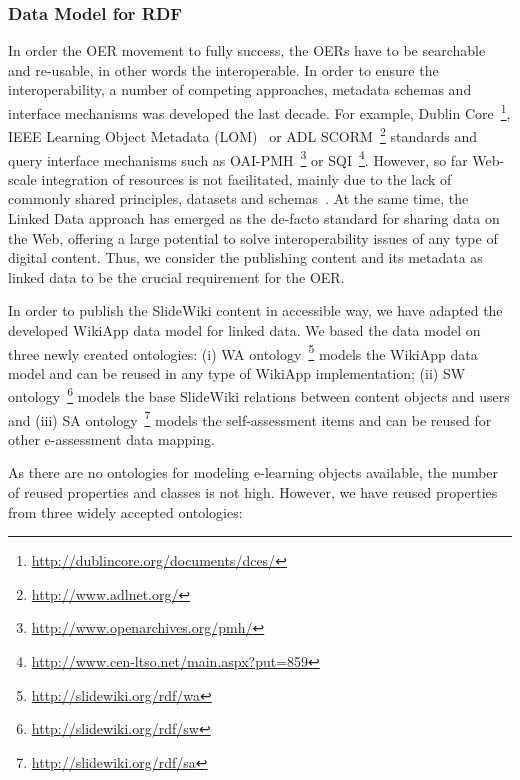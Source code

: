 \documentclass[ngerman,UKenglish,table]{scrbook}
\begin{document}
 

\subsubsection{Data Model for RDF}
\label{sec:data_model_rdf}

In order the OER movement to fully success, the OERs have to be searchable and re-usable, in other words the interoperable.
In order to ensure the interoperability, a number of competing approaches, metadata schemas and interface mechanisms was developed the last decade. 
For example, Dublin Core~\footnote{\url{http://dublincore.org/documents/dces/}}, IEEE Learning Object Metadata (LOM)~\cite{learning2002ieee} or ADL SCORM~\footnote{\url{http://www.adlnet.org/}} standards and query interface mechanisms such as OAI-PMH~\footnote{\url{http://www.openarchives.org/pmh/}} or SQI~\footnote{\url{http://www.cen-ltso.net/main.aspx?put=859}}.
However, so far Web-scale integration of resources is not facilitated, mainly due to the lack of commonly shared principles, datasets and schemas~\cite{Dietze:2012:LEI:2245276.2245347}.
At the same time, the Linked Data approach has emerged as the de-facto standard for sharing data on the Web, offering a large potential to solve interoperability issues of any type of digital content.
Thus, we consider the publishing content and its metadata as linked data to be the crucial requirement for the OER.

In order to publish the SlideWiki content in accessible way, we have adapted the developed WikiApp data model for linked data. 
We based the data model on three newly created ontologies: (i) WA ontology~\footnote{\url{http://slidewiki.org/rdf/wa}} models the WikiApp data model and can be reused in any type of WikiApp implementation; (ii) SW ontology~\footnote{\url{http://slidewiki.org/rdf/sw}} models the base SlideWiki relations between content objects and users and (iii) SA ontology~\footnote{\url{http://slidewiki.org/rdf/sa}} models the self-assessment items and can be reused for other e-assessment data mapping.

As there are no ontologies for modeling e-learning objects available, the number of reused properties and classes is not high.
However, we have reused properties from three widely accepted ontologies: 
\end{document}
